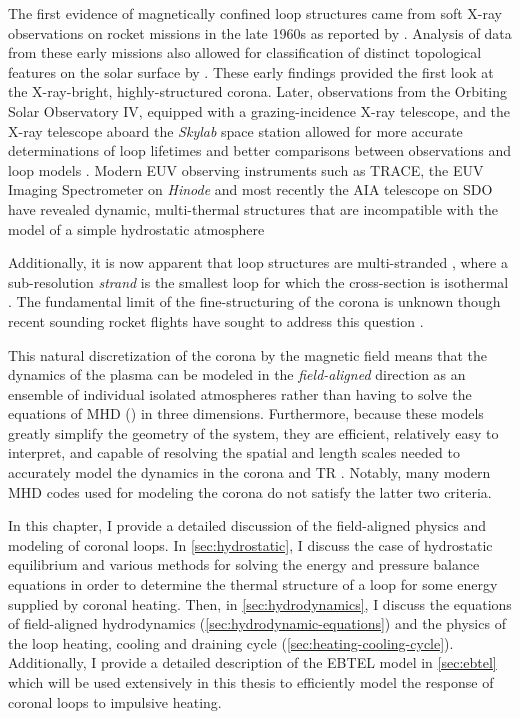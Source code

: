 The first evidence of magnetically confined loop structures came from soft X-ray observations on rocket missions in the late 1960s as reported by \citet{vaiana_x-ray_1968}. Analysis of data from these early missions also allowed for classification of distinct topological features on the solar surface by \citet{vaiana_identification_1973}. These early findings provided the first look at the X-ray-bright, highly-structured corona. Later, observations from the Orbiting Solar Observatory IV, equipped with a grazing-incidence X-ray telescope, and the X-ray telescope aboard the \textit{Skylab} space station \citep{krieger_results_1972,reale_coronal_2010} allowed for more accurate determinations of loop lifetimes and better comparisons between observations and loop models \citep{rosner_dynamics_1978}. Modern EUV observing instruments such as TRACE, the EUV Imaging Spectrometer \citep[EIS,][]{culhane_euv_2007} on \textit{Hinode} and most recently the AIA telescope on SDO have revealed dynamic, multi-thermal structures that are incompatible with the model of a simple hydrostatic atmosphere \citep[e.g.][]{warren_hydrodynamic_2002,winebarger_steady_2002,del_zanna_flows_2008,viall_evidence_2012} 

Additionally, it is now apparent that loop structures are multi-stranded \citep{gomez_normal_1993}, where a sub-resolution \textit{strand} is the smallest loop for which the cross-section is isothermal \citep{bradshaw_diagnosing_2012}. The fundamental limit of the fine-structuring of the corona is unknown though recent sounding rocket flights have sought to address this question \citep{cirtain_energy_2013,aschwanden_width_2017}.

This natural discretization of the corona by the magnetic field means that the dynamics of the plasma can be modeled in the \textit{field-aligned} direction as an ensemble of individual isolated atmospheres rather than having to solve the equations of MHD () in three dimensions. Furthermore, because these models greatly simplify the geometry of the system, they are efficient, relatively easy to interpret, and capable of resolving the spatial and length scales needed to accurately model the dynamics in the corona and TR \citep{bradshaw_influence_2013}. Notably, many modern MHD codes used for modeling the corona do not satisfy the latter two criteria.

In this chapter, I provide a detailed discussion of the field-aligned physics and modeling of coronal loops. In \autoref{sec:hydrostatic}, I discuss the case of hydrostatic equilibrium and various methods for solving the energy and pressure balance equations in order to determine the thermal structure of a loop for some energy supplied by coronal heating. Then, in \autoref{sec:hydrodynamics}, I discuss the equations of field-aligned hydrodynamics (\autoref{sec:hydrodynamic-equations}) and the physics of the loop heating, cooling and draining cycle (\autoref{sec:heating-cooling-cycle}). Additionally, I provide a detailed description of the EBTEL model in \autoref{sec:ebtel} which will be used extensively in this thesis to efficiently model the response of coronal loops to impulsive heating.

